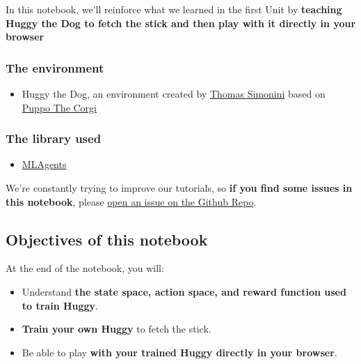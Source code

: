 \documentclass[11pt,a4paper]{article}
\begin{document}
In this notebook, we'll reinforce what we learned in the first Unit by \textbf{teaching Huggy the Dog to fetch the stick and then play with it directly in your browser}


\subsubsection{The environment}\label{the-environment}

\begin{itemize}
\tightlist
\item
  Huggy the Dog, an environment created by \href{https://twitter.com/ThomasSimonini}{Thomas Simonini} based on \href{https://blog.unity.com/technology/puppo-the-corgi-cuteness-overload-with-the-unity-ml-agents-toolkit}{Puppo The Corgi}
\end{itemize}

\subsubsection{The library used}\label{the-library-used}

\begin{itemize}
\tightlist
\item
  \href{https://github.com/Unity-Technologies/ml-agents}{MLAgents}
\end{itemize}

We're constantly trying to improve our tutorials, so \textbf{if you find some issues in this notebook}, please \href{https://github.com/huggingface/deep-rl-class/issues}{open an issue on the Github Repo}.

\subsection{Objectives of this notebook}\label{objectives-of-this-notebook}

At the end of the notebook, you will:

\begin{itemize}
\tightlist
\item
  Understand \textbf{the state space, action space, and reward function used to train Huggy}.
\item
  \textbf{Train your own Huggy} to fetch the stick.
\item
  Be able to play \textbf{with your trained Huggy directly in your browser}.
\end{itemize}
\end{document}

